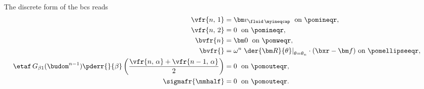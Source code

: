 The discrete form of the \acp{bc}  reads
\bw
\begin{align}
        \label{bc_fl_rigid_1_reference_disc}
        \vfr{n, \, 1}                                                                                                       & = \vfin \; \text{ on }\pomineqr,                                                                                                          \\
        \label{bc_fl_rigid_2_reference_disc}
        \vfr{n, \, 2}                                                                                                       & =  0 \; \text{ on } \pomineqr ,                                                                                                           \\
        \label{bc_fl_rigid_3_reference_disc}
        \bvfr{n}                                                                                                            & = {\bm 0} \; \text{ on } \pomweqr ,                                                                                                       \\
        \label{bc_fl_rigid_4_reference_disc}
        {\bvfr{}}                                                                                                           & =
        \omega^n  \left. \der{{\bm R}}{\theta} \right|_{\theta = \theta_n} \cdot (\bxr - \bfocalpoint)  \text{ on } \pomellipseeqr ,                                                                                                                                    \\
        \label{bc_fl_rigid_5_reference_disc}
        \etaf \, G_{\beta 1}(\budom^{n-1}) \pderr{}{\beta}\left( \frac{\vfr{n, \, \alpha} + \vfr{n-1, \, \alpha}}{2}\right) & = 0                                                                                                           \; \text{ on } \pomouteqr , \\
        \label{bc_fl_rigid_6_reference_disc}
        \sigmafr{\nmhalf}                                                                                                   & = 0 \; \text{ on } \pomouteqr.
\end{align}
\ew


